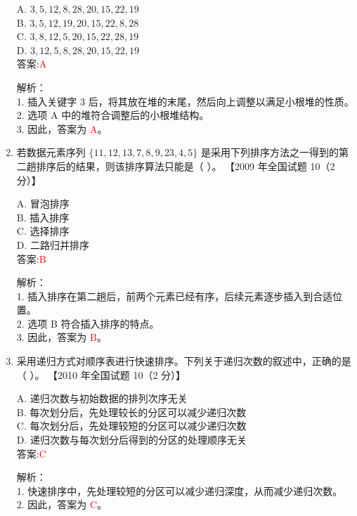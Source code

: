 \documentclass[lang=cn,newtx,10pt,scheme=chinese]{../../../elegantbook}
\begin{document}
\begin{enumerate}
    A. $3, 5, 12, 8, 28, 20, 15, 22, 19$ \\  
    B. $3, 5, 12, 19, 20, 15, 22, 8, 28$ \\  
    C. $3, 8, 12, 5, 20, 15, 22, 28, 19$ \\  
    D. $3, 12, 5, 8, 28, 20, 15, 22, 19$ \\  

    答案:\textcolor{red}{A}

    解析：\\
    1. 插入关键字 3 后，将其放在堆的末尾，然后向上调整以满足小根堆的性质。\\
    2. 选项 A 中的堆符合调整后的小根堆结构。\\
    3. 因此，答案为 \textcolor{red}{A}。\\

\item 若数据元素序列 $\{11, 12, 13, 7, 8, 9, 23, 4, 5\}$ 是采用下列排序方法之一得到的第二趟排序后的结果，则该排序算法只能是（ ）。  
    【2009 年全国试题 10（2 分）】  

    A. 冒泡排序 \\  
    B. 插入排序 \\  
    C. 选择排序 \\  
    D. 二路归并排序 \\  

    答案:\textcolor{red}{B}

    解析：\\
    1. 插入排序在第二趟后，前两个元素已经有序，后续元素逐步插入到合适位置。\\
    2. 选项 B 符合插入排序的特点。\\
    3. 因此，答案为 \textcolor{red}{B}。\\

\item 采用递归方式对顺序表进行快速排序。下列关于递归次数的叙述中，正确的是（ ）。  
    【2010 年全国试题 10（2 分）】  

    A. 递归次数与初始数据的排列次序无关 \\  
    B. 每次划分后，先处理较长的分区可以减少递归次数 \\  
    C. 每次划分后，先处理较短的分区可以减少递归次数 \\  
    D. 递归次数与每次划分后得到的分区的处理顺序无关 \\  

    答案:\textcolor{red}{C}

    解析：\\
    1. 快速排序中，先处理较短的分区可以减少递归深度，从而减少递归次数。\\
    2. 因此，答案为 \textcolor{red}{C}。\\


\end{enumerate}
\end{document}
